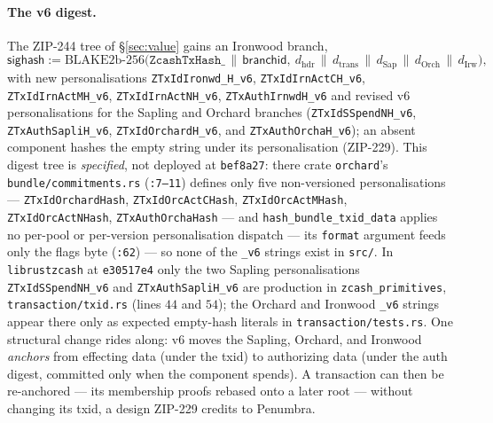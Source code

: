 \documentclass[11pt,a4paper]{article}
\theoremstyle{definition}
\begin{document}
\paragraph{The v6 digest.} The ZIP-244 tree of \S\ref{sec:value} gains an
Ironwood branch,
\[
\mathsf{sighash} := \mathrm{BLAKE2b\text{-}256}\bigl(\texttt{ZcashTxHash\_}
\,\|\, \mathsf{branchid},\ d_{\mathrm{hdr}} \,\|\, d_{\mathrm{trans}}
\,\|\, d_{\mathrm{Sap}} \,\|\, d_{\mathrm{Orch}} \,\|\,
d_{\mathrm{Irw}}\bigr),
\]
with new personalisations \texttt{ZTxIdIronwd\_H\_v6},
\texttt{ZTxIdIrnActCH\_v6}, \texttt{ZTxIdIrnActMH\_v6},
\texttt{ZTxIdIrnActNH\_v6}, \texttt{ZTxAuthIrnwdH\_v6} and revised v6
personalisations for the Sapling and Orchard branches
(\texttt{ZTxIdSSpendNH\_v6}, \texttt{ZTxAuthSapliH\_v6},
\texttt{ZTxIdOrchardH\_v6}, and \texttt{ZTxAuthOrchaH\_v6}); an absent
component
hashes the empty string under its personalisation (ZIP-229). This digest tree
is \emph{specified}, not deployed at \texttt{bef8a27}: there crate
\texttt{orchard}'s \texttt{bundle/commitments.rs} (\texttt{:7--11}) defines only
five non-versioned personalisations ---
\texttt{ZTxIdOrchardHash}, \texttt{ZTxIdOrcActCHash},
\texttt{ZTxIdOrcActMHash}, \texttt{ZTxIdOrcActNHash},
\texttt{ZTxAuthOrchaHash} --- and
\texttt{hash\_bundle\_txid\_data} applies no per-pool or per-version
personalisation dispatch --- its \texttt{format} argument feeds only the flags
byte (\texttt{:62}) --- so none of the \texttt{\_v6} strings exist in
\texttt{src/}. In \texttt{librustzcash} at \texttt{e30517e4} only the two
Sapling personalisations \texttt{ZTxIdSSpendNH\_v6} and
\texttt{ZTxAuthSapliH\_v6} are production in
\texttt{zcash\_primitives}, \texttt{transaction/txid.rs} (lines $44$
and $54$); the Orchard and Ironwood \texttt{\_v6} strings appear there only as
expected empty-hash literals in \texttt{transaction/tests.rs}. One structural
change
rides along: v6 moves the Sapling, Orchard, and Ironwood \emph{anchors} from
effecting data (under the txid) to authorizing data (under the auth digest,
committed only when the component spends). A transaction can then be
re-anchored --- its membership proofs rebased onto a later root --- without
changing its txid, a design ZIP-229 credits to Penumbra.
\end{document}
